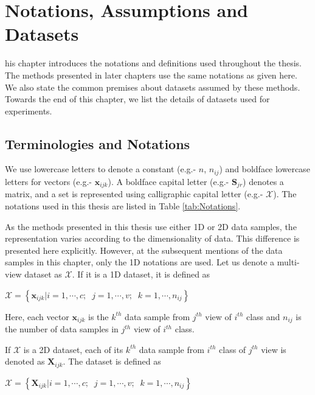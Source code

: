 \chapter{Notations, Assumptions and Datasets}
\label{ch:Notations_Data}
his chapter introduces the notations and definitions used throughout the thesis. The methods presented in later chapters use the same notations as given here. We also state the common premises about datasets assumed by these methods. Towards the end of this chapter, we list the details of datasets used for experiments.



\section{Terminologies and Notations}
\label{sec:Notations}
\hspace{0.8cm}We use lowercase letters to denote a constant (e.g.- $n$, $n_{ij}$) and boldface lowercase letters for vectors (e.g.- $\textbf{x}_{ijk}$). A boldface capital letter (e.g.- $\textbf{S}_{jr}$) denotes a matrix, and a set is represented using calligraphic capital letter (e.g.- $\mathcal{X}$). The notations used in this thesis are listed in Table \ref{tab:Notations}.

As the methods presented in this thesis use either 1D or 2D data samples, the representation varies according to the dimensionality of data. This difference is presented here explicitly. However, at the subsequent mentions of the data samples in this chapter, only the 1D notations are used. Let us denote a multi-view dataset as $\mathcal{X}$. If it is a 1D dataset, it is defined as

\begin{center}
$\mathcal{X} = \left \{ \textbf{x}_{ijk} | i=1,\cdots,c; \;\; j=1,\cdots,v; \;\; k=1,\cdots,n_{ij} \right \}$
\end{center}

Here, each vector $\textbf{x}_{ijk}$ is the $k^{th}$ data sample from $j^{th}$ view of $i^{th}$ class and $n_{ij}$ is the number of data samples in $j^{th}$ view of $i^{th}$ class.

If $\mathcal{X}$ is a 2D dataset, each of its $k^{th}$ data sample from $i^{th}$ class of $j^{th}$ view is denoted as $\textbf{X}_{ijk}$. The dataset is defined as

\begin{center}
$\mathcal{X} = \left \{ \textbf{X}_{ijk} | i=1,\cdots,c; \;\; j=1,\cdots,v; \;\; k=1,\cdots,n_{ij} \right \}$
\end{center}

